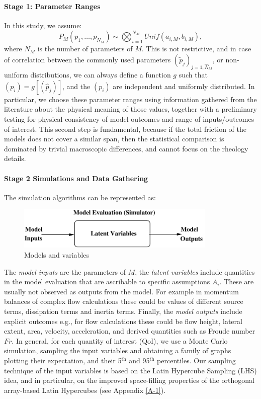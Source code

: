 \documentclass{article}
\begin{document}
\paragraph{Stage 1: Parameter Ranges} In this study, we assume:
$$P_M\left(p_1,\dots,p_{N_M}\right)\sim \bigotimes_{i=1}^{N_M} Unif(a_{i,M},b_{i,M}),$$
where $N_M$ is the number of parameters of $M$. This is not restrictive, and in case of correlation between the commonly used parameters $(\tilde p_j)_{j=1,\hat N_M}$, or non-uniform distributions, we can always define a function $g$ such that $(p_i)=g\left[(\hat p_j)\right]$, and the $(p_i)$ are independent and uniformly distributed. In particular, we choose these parameter ranges using information gathered from the literature about the physical meaning of those values, together with a preliminary testing for physical consistency of model outcomes and range of inputs/outcomes of interest. This second step is fundamental, because if the total friction of the models does not cover a similar span, then the statistical comparison is dominated by trivial macroscopic differences, and cannot focus on the rheology details.

\paragraph{Stage 2 Simulations and Data Gathering}
The simulation algorithms can be represented as:
\begin{figure}[H]
\centerline{\includegraphics[width=0.85\textwidth]{modelproc.pdf}}
\centering
\caption{Models and variables}
\end{figure}

The \emph{model inputs} are the parameters of $M$, the \emph{latent variables} include quantities in the model evaluation that are ascribable to specific assumptions $A_i$. These are usually not observed as outputs from the model. For example in momentum balances of complex flow calculations these could be values of different source terms, dissipation terms and inertia terms. Finally, the \emph{model outputs} include explicit outcomes e.g., for flow calculations these could be flow height, lateral extent, area, velocity, acceleration, and derived quantities such as Froude number $Fr$. In general, for each quantity of interest (QoI), we use a Monte Carlo simulation, sampling the input variables and obtaining a family of graphs plotting their expectation, and their 5$^{\mathrm{th}}$ and 95$^{\mathrm{th}}$ percentiles. Our sampling technique of the input variables is based on the Latin Hypercube Sampling (LHS) idea, and in particular, on the improved space-filling properties of the orthogonal array-based Latin Hypercubes (see Appendix \ref{A-1}).
\end{document}

